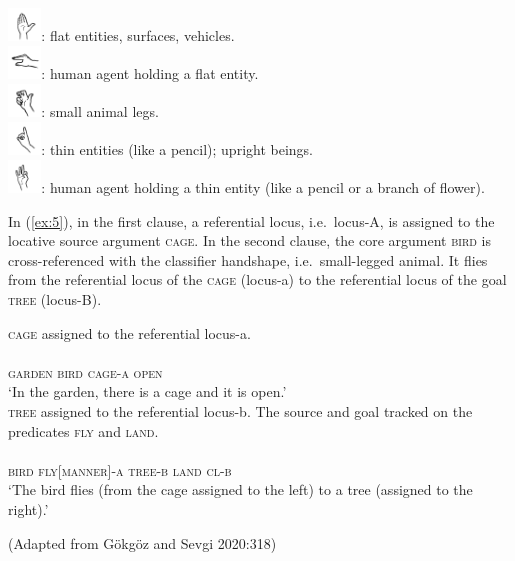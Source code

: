 \documentclass[]{elsarticle} %
\begin{document}
\begin{exe}
\ex \label{ex:4}
\includegraphics[width=25pt]{pictures/flathand.png}: flat entities, surfaces, vehicles.\\
\includegraphics[width=25pt]{pictures/flat.png}: human agent holding a flat entity.\\
\includegraphics[width=25pt]{pictures/small_legged.png}: small animal legs.\\
\includegraphics[width=25pt]{pictures/index.png}: thin entities (like a pencil); upright beings.\\
\includegraphics[width=25pt]{pictures/hold.png}: human agent holding a thin entity (like a pencil or a branch of flower). 
\end{exe}

In (\ref{ex:5}), in the first clause, a referential locus, i.e.~locus-A,
is assigned to the locative source argument \textsc{cage}. In the second
clause, the core argument \textsc{bird} is cross-referenced with the
classifier handshape, i.e.~small-legged animal. It flies from the
referential locus of the \textsc{cage} (locus-a) to the referential
locus of the goal \textsc{tree} (locus-B).

\begin{exe}
    \ex \label{ex:5}
\begin{xlist}
    \ex \textsc{cage} assigned to the referential locus-a. \\ \\
    \textsc{garden bird cage-a open} \\
    ‘In the garden, there is a cage and it is open.’
    \\
    
    \ex \textsc{tree} assigned to the referential locus-b. The source and goal tracked on the predicates \textsc{fly} and \textsc{land}. \\ \\
    \textsc{bird fly[manner]-a tree-b land cl-b}\\
    ‘The bird flies (from the cage assigned to the left) to a tree (assigned to the right).’
    \end{xlist}
    \end{exe}
    \hfill (Adapted from Gökgöz and Sevgi 2020:318)
\end{document}
